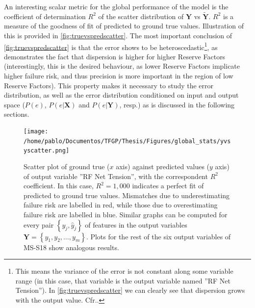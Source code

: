 \indent An interesting scalar metric for the global performance of the model is the coefficient of determination $R^2$ \cite{zhang2017coefficient} of the scatter distribution of $\mathbf{Y}$ vs $\mathbf{\tilde{Y}}$. $R^2$ is a measure of the goodness of fit of predicted to ground true values. Illustration of this is provided in \autoref{fig:truevspredscatter}. The most important conclusion of \autoref{fig:truevspredscatter} is that the error shows to be heteroscedastic{\protect\footnote{This means the variance of the error is not constant along some variable range (in this case, that variable is the output variable named ''RF Net Tension''). In \autoref{fig:truevspredscatter} we can clearly see that dispersion grows with the output value. Cfr.\cite[p. 374]{jobson2012applied}.}}, as demonstrates the fact that dispersion is higher for higher Reserve Factors (interestingly, this is the desired behaviour, as lower Reserve Factors implicate higher failure risk, and thus precision is more important in the region of low Reserve Factors). This property makes it necessary to study the error distribution, as well as the error distribution conditioned on input and output space ($P(e)$, $P(e|\mathbf{X})$ and $P(e|\mathbf{Y})$, resp.) as is discussed in the following sections.\\
%
\begin{figure}
	\centering
	\texttt{[image: /home/pablo/Documentos/TFGP/Thesis/Figures/global\_stats/yvsyscatter.png]}
	\caption{Scatter plot of ground true ($x$ axis) against predicted values ($y$ axis) of output variable ''RF Net Tension'', with the correspondent $R^2$ coefficient. In this case, $R^2=1,000$ indicates a perfect fit of predicted to ground true values. Mismatches due to underestimating failure risk are labelled in red, while those due to overestimating failure risk are labelled in blue. Similar graphs can be computed for every pair $\left\{y_j,\hat{y}_j\right\}$ of features in the output variables $\mathbf{Y}=\left\{y_1,y_2,\ldots,y_m\right\}$. Plots for the rest of the six output variables of MS-S18 show analogous results.}
	\label{fig:truevspredscatter}
\end{figure}
%
\clearpage
